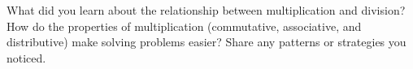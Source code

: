 \documentclass[12pt]{article}
\begin{document}
\vspace{1em}

\begin{tcolorbox}[colframe=black!60, colback=white, 
coltitle=black, colbacktitle=black!15, fonttitle=\bfseries\Large, 
title=Reflection, halign title=center, left=10pt, right=10pt, top=10pt, bottom=80pt]
What did you learn about the relationship between multiplication and division? How do the properties of multiplication (commutative, associative, and distributive) make solving problems easier? Share any patterns or strategies you noticed.
\end{tcolorbox}
\end{document}

